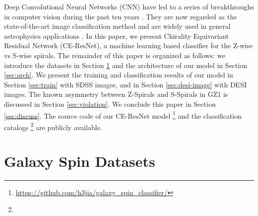 \documentclass[twocolumn]{aastex631}
\begin{document}

Deep Convolutional Neural Networks (CNN) have led to a series of breakthroughs in computer vision during the past ten years \citep{lecun1989backpropagation,krizhevsky2012imagenet,he2016deep,tan2019efficient}.
They are now regarded as the state-of-the-art image classification method and are widely used in general astrophysics applications  \citep{2010MNRAS.406..342B,2011A&A...525A.157H,2015MNRAS.450.1441D,he2019learning,2020arXiv201213083A,lin2020feature}.
In this paper, we present Chirality Equivariant Residual Network (CE-ResNet), a machine learning based classifier for the Z-wise vs S-wise spirals.
The remainder of this paper is organized as follows: we introduce the datasets in Section \ref{sec:dataset} and the architecture of our model in Section \ref{sec:arch}.
We present the training and classification results of our model in Section \ref{sec:train} with SDSS images, and in Section \ref{sec:desi-image} with DESI images.
The known asymmetry between Z-Spirals and S-Spirals in GZ1 is discussed in Section \ref{sec:violation}.
We conclude this paper in Section \ref{sec:discuss}.
The source code of our CE-ResNet model \footnote{\url{https://github.com/h3jia/galaxy_spin_classifier/}} and the classification catalogs \footnote{} are publicly available.


\section{Galaxy Spin Datasets}

\label{sec:dataset}
\end{document}
